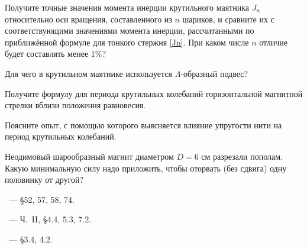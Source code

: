 \begin{lab:questions}
\item Получите точные значения момента инерции крутильного маятника $J_n$
относительно оси вращения, составленного из  $n$ шариков, и сравните
их с соответствующими значениями момента инерции, рассчитанными по приближённой
формуле для тонкого стержня \eqref{Jn}. При каком числе $n$
отличие будет составлять менее 1\%?

\item Для чего в крутильном маятнике используется $\Lambda$-образный подвес?

\item Получите формулу для периода крутильных колебаний горизонтальной магнитной
стрелки вблизи положения равновесия.

\item Поясните опыт, с помощью которого выясняется влияние упругости нити на
период крутильных колебаний.

\item Неодимовый шарообразный магнит диаметром $D=6$ см разрезали пополам. Какую
минимальную силу надо приложить, чтобы оторвать (без сдвига) одну половинку от
другой? 


\end{lab:questions}

\begin{lab:literature}
    \item \SivuhinIII~--- \S 52, 57, 58, 74.
    \item \KingLokOlh~--- Ч.~II, \S 4.4, 5.3, 7.2.
    \item \Kirichenko~--- \S 3.4, 4.2.
\end{lab:literature}

